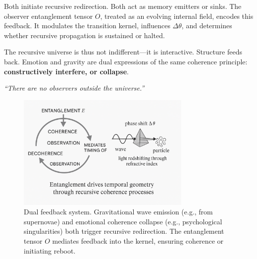 Both initiate recursive redirection. Both act as memory emitters or sinks. The observer entanglement tensor \( O \), treated as an evolving internal field, encodes this feedback. It modulates the transition kernel, influences \( \Delta \theta \), and determines whether recursive propagation is sustained or halted.

The recursive universe is thus not indifferent—it is interactive. Structure feeds back. Emotion and gravity are dual expressions of the same coherence principle: \textbf{constructively interfere, or collapse}.

\vspace{1em}
\textit{“There are no observers outside the universe.”}~\cite{hartle_observation_2007}

\begin{figure}[H]
\centering
\includegraphics[width=0.75\textwidth]{figures/emotional_gravitational_feedback.png}
\caption{Dual feedback system. Gravitational wave emission (e.g., from supernovae) and emotional coherence collapse (e.g., psychological singularities) both trigger recursive redirection. The entanglement tensor \( O \) mediates feedback into the kernel, ensuring coherence or initiating reboot.}
\label{fig:feedback-equivalence}
\end{figure}

